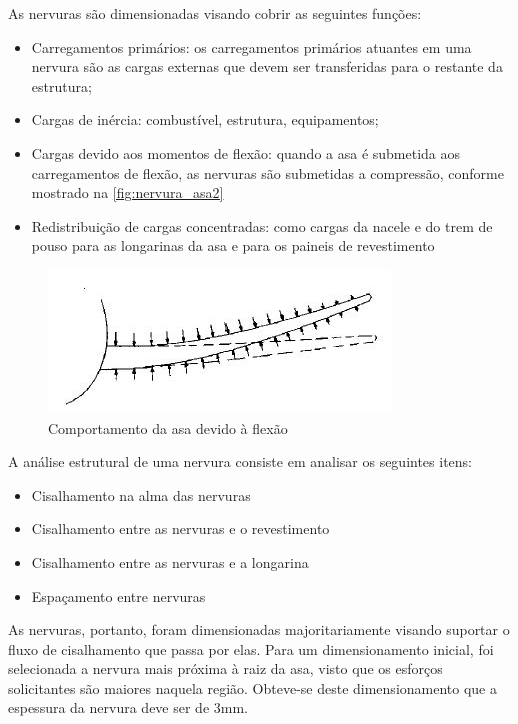 As nervuras são dimensionadas visando cobrir as seguintes funções:
\begin{itemize}
  \item Carregamentos primários: os carregamentos primários atuantes em uma nervura são as cargas externas que devem ser transferidas para o restante da estrutura;
  \item Cargas de inércia: combustível, estrutura, equipamentos;
  \item Cargas devido aos momentos de flexão: quando a asa é submetida aos carregamentos de flexão, as nervuras são submetidas a compressão, conforme mostrado na \autoref{fig:nervura_asa2}
  \item Redistribuição de cargas concentradas: como cargas da nacele e do trem de pouso para as longarinas da asa e para os paineis de revestimento
\end{itemize}

\begin{figure}
\centering
\includegraphics[width=\textwidth]{images/parte4/nervura2}
\caption{Comportamento da asa devido à flexão}
\label{fig:nervura_asa2}
\end{figure}

A análise estrutural de uma nervura consiste em analisar os seguintes itens:
\begin{itemize}
  \item Cisalhamento na alma das nervuras
  \item Cisalhamento entre as nervuras e o revestimento
  \item Cisalhamento entre as nervuras e a longarina
  \item Espaçamento entre nervuras
\end{itemize}

As nervuras, portanto, foram dimensionadas majoritariamente visando suportar o fluxo de cisalhamento que passa por elas. 
Para um dimensionamento inicial, foi selecionada a nervura mais próxima à raiz da asa, visto que os esforços solicitantes são maiores naquela região.
Obteve-se deste dimensionamento que a espessura da nervura deve ser de 3mm.

